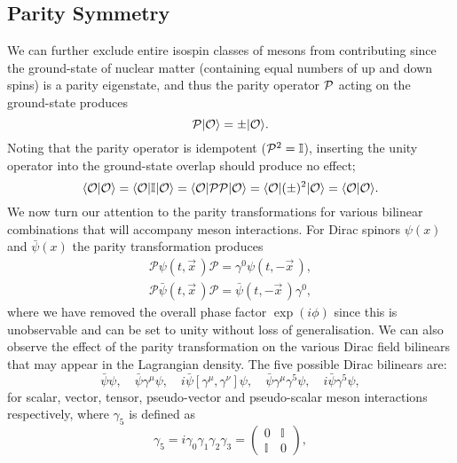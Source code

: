 \documentclass[11pt,a4paper,twoside]{carrollthesis}
\newcommand{\be}{\begin{equation}}
\newcommand{\ee}{\end{equation}}
\newcommand{\bra}{\langle}
\newcommand{\ket}{\rangle}
\begin{document}
\subsection{Parity Symmetry}\label{subsec:parity}
%
We can further exclude entire isospin classes of mesons from
contributing since the ground-state of nuclear matter (containing
equal numbers of up and down spins) is a parity eigenstate, and thus
the parity operator ${\cal P}$ acting on the ground-state produces
%
\be {\cal P}|{\cal O}\ket = \pm |{\cal O}\ket.  \ee
%
Noting that the parity operator is idempotent (${\cal P}^2 = {\mathbb
  I}$), inserting the unity operator into the ground-state overlap
should produce no effect;
%
\be \bra{\cal O}|{\cal O}\ket = \bra{\cal O}|{\mathbb I}|{\cal O}\ket
= \bra{\cal O}|{\cal P}{\cal P}|{\cal O}\ket = \bra{\cal
  O}|(\pm)^2|{\cal O}\ket = \bra{\cal O}|{\cal
  O}\ket.  \ee
%
We now turn our attention to the parity transformations for various
bilinear combinations that will accompany meson interactions. For
Dirac spinors $\psi(x)$ and $\bar{\psi}(x)$ the parity transformation
produces
%
\be \begin{array}{cc} \mathcal{P}\psi(t,\vec{x}\, )\mathcal{P} =
  \gamma^0\psi(t,-\vec{x}\, ), \\[2mm]
  \mathcal{P}\bar{\psi}(t,\vec{x}\, )\mathcal{P} =
  \bar{\psi}(t,-\vec{x}\, )\gamma^0, \end{array} \ee
%
where we have removed the overall phase factor $\exp(i\phi)$ since
this is unobservable and can be set to unity without loss of
generalisation. We can also observe the effect of the parity
transformation on the various Dirac field bilinears that may appear
in the Lagrangian density. The five possible Dirac bilinears are:
%
\be \bar{\psi}\psi,\quad \bar{\psi}\gamma^\mu\psi,\quad
i\bar{\psi}[\gamma^\mu,\gamma^\nu]\psi,\quad
\bar{\psi}\gamma^\mu\gamma^5\psi,\quad i\bar{\psi}\gamma^5\psi, \ee
%
for scalar, vector, tensor, pseudo-vector and pseudo-scalar meson
interactions respectively, where $\gamma_5$ is defined as
%
\be \label{eq:gam5} \gamma_5 = i\gamma_0\gamma_1\gamma_2\gamma_3 =
\left(\begin{array}{cc}0&{\mathbb I}\\{\mathbb I}&0\end{array}\right),
  \ee
%
\end{document}
